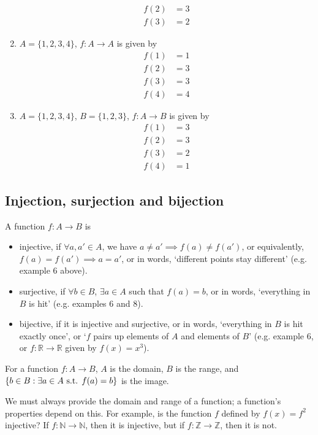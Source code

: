 \begin{enumerate}
\begin{align*}
		      f(2) & = 3 \\
		      f(3) & = 2
	      \end{align*}
	\item \(A = \{ 1, 2, 3, 4 \}\), \(f\colon A \to A\) is given by
	      \begin{align*}
		      f(1) & = 1 \\
		      f(2) & = 3 \\
		      f(3) & = 3 \\
		      f(4) & = 4
	      \end{align*}
	\item \(A = \{ 1, 2, 3, 4 \}\), \(B = \{ 1, 2, 3 \}\), \(f\colon A \to B\) is given by
	      \begin{align*}
		      f(1) & = 3 \\
		      f(2) & = 3 \\
		      f(3) & = 2 \\
		      f(4) & = 1
	      \end{align*}
\end{enumerate}

\subsection{Injection, surjection and bijection}
\begin{definition}
	A function \(f\colon A \to B\) is
	\begin{itemize}
		\item injective, if \(\forall a, a' \in A\), we have \(a \neq a' \implies f(a) \neq f(a')\), or equivalently, \(f(a) = f(a') \implies a = a'\), or in words, `different points stay different' (e.g.
		      example 6 above).
		\item surjective, if \(\forall b \in B\), \(\exists a \in A\) such that \(f(a) = b\), or in words, `everything in \(B\) is hit' (e.g.
		      examples 6 and 8).
		\item bijective, if it is injective and surjective, or in words, `everything in \(B\) is hit exactly once', or `\(f\) pairs up elements of \(A\) and elements of \(B\)' (e.g.
		      example 6, or \(f\colon \mathbb R \to \mathbb R\) given by \(f(x) = x^3\)).
	\end{itemize}
\end{definition}
\begin{definition}
	For a function \(f\colon A \to B\), \(A\) is the domain, \(B\) is the range, and \(\{ b \in B : \exists a \in A \text{ s.t. } f(a) = b \}\) is the image.
\end{definition}
We must always provide the domain and range of a function; a function's properties depend on this.
For example, is the function \(f\) defined by \(f(x) = f^2\) injective?
If \(f\colon \mathbb N \to \mathbb N\), then it is injective, but if \(f\colon \mathbb Z \to \mathbb Z\), then it is not.

